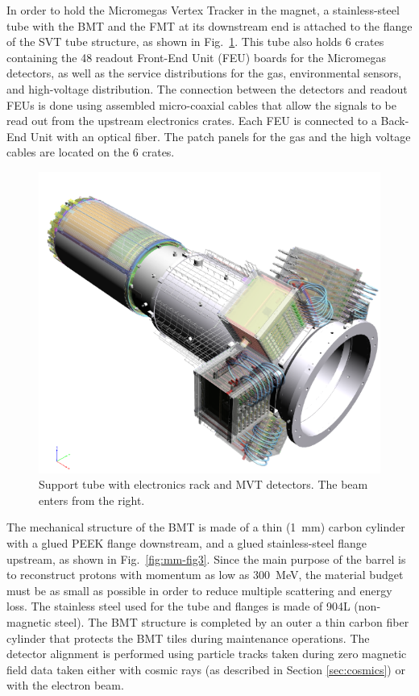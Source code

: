 In order to hold the Micromegas Vertex Tracker in the magnet, a stainless-steel tube with the BMT and the FMT at its
downstream end is attached to the flange of the SVT tube structure, as shown in Fig.~\ref{fig:mm-fig2}. This tube also
holds 6 crates containing the 48 readout Front-End Unit (FEU) boards for the Micromegas detectors, as well as the service
distributions for the gas, environmental sensors, and high-voltage distribution. The connection between the detectors and
readout FEUs is done using assembled micro-coaxial cables that allow the signals to be read out from the upstream
electronics crates. Each FEU is connected to a Back-End Unit with an optical fiber. The patch panels for the gas and the high
voltage cables are located on the 6 crates.

\begin{figure}[htb]
 \includegraphics[width=1.0\columnwidth,keepaspectratio]{images/fig2}
 \caption{Support tube with electronics rack and MVT detectors. The beam enters from the right.}
 \label{fig:mm-fig2}
\end{figure}

The mechanical structure of the BMT is made of a thin (1~mm) carbon cylinder with a glued PEEK flange downstream, and a
glued stainless-steel flange upstream, as shown in Fig.~\ref{fig:mm-fig3}. Since the main purpose of the barrel is to
reconstruct protons with momentum as low as 300~MeV, the material budget must be as small as possible in order to reduce
multiple scattering and energy loss. The stainless steel used for the tube and flanges is made of 904L (non-magnetic steel).
The BMT structure is completed by an outer a thin carbon fiber cylinder that protects the BMT tiles during maintenance operations.   
The detector alignment is performed using particle tracks taken during zero magnetic field data taken either with cosmic
rays (as described in Section \ref{sec:cosmics}) or with the electron beam.

